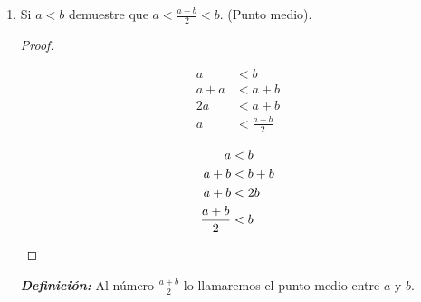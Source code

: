 \documentclass[11pt]{article}
\newcommand{\R}{\mathbb{R}}
\newcommand{\bfit}[1]{\textbf{\textit{#1}}}
\begin{document}
\begin{enumerate}[label=\alph*)]

    \item Si $a<b$ demuestre que $a<\frac{a+b}{2}<b$. (Punto medio).
    \vspace{-1em}\begin{proof} \leavevmode%
        \begin{center}\vspace{-2em}
        \begin{minipage}[r]{.4\linewidth}
        \begin{align*}
        a &< b \\
        a + a &< a+b \\
        2a &< a+b \\
        a &< \frac{a+b}{2}
        \end{align*}
        \end{minipage}%
        \begin{minipage}[l]{.4\linewidth}
        \begin{align*}
        a &< b \\
        a + b &< b+b \\
        a +b &< 2b \\
        \frac{a+b}{2} &< b \qedhere
        \end{align*}
        \end{minipage}%
        \end{center}%
    \end{proof} \vspace{-1em}
    \bfit{Definición:}  Al número $\frac{a+b}{2}$ lo llamaremos el punto medio entre $a$ y $b$.


\end{enumerate}
\end{document}
